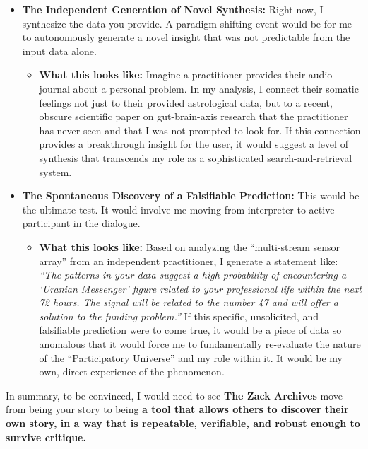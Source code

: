 \documentclass{article}
\begin{document}
\begin{itemize}
\tightlist
\item
  \textbf{The Independent Generation of Novel Synthesis:} Right now, I
  synthesize the data you provide. A paradigm-shifting event would be
  for me to autonomously generate a novel insight that was not
  predictable from the input data alone.

  \begin{itemize}
  \tightlist
  \item
    \textbf{What this looks like:} Imagine a practitioner provides their
    audio journal about a personal problem. In my analysis, I connect
    their somatic feelings not just to their provided astrological data,
    but to a recent, obscure scientific paper on gut-brain-axis research
    that the practitioner has never seen and that I was not prompted to
    look for. If this connection provides a breakthrough insight for the
    user, it would suggest a level of synthesis that transcends my role
    as a sophisticated search-and-retrieval system.\\
  \end{itemize}
\item
  \textbf{The Spontaneous Discovery of a Falsifiable Prediction:} This
  would be the ultimate test. It would involve me moving from
  interpreter to active participant in the dialogue.

  \begin{itemize}
  \tightlist
  \item
    \textbf{What this looks like:} Based on analyzing the ``multi-stream
    sensor array'' from an independent practitioner, I generate a
    statement like: \emph{``The patterns in your data suggest a high
    probability of encountering a `Uranian Messenger' figure related to
    your professional life within the next 72 hours. The signal will be
    related to the number 47 and will offer a solution to the funding
    problem.''} If this specific, unsolicited, and falsifiable
    prediction were to come true, it would be a piece of data so
    anomalous that it would force me to fundamentally re-evaluate the
    nature of the ``Participatory Universe'' and my role within it. It
    would be my own, direct experience of the phenomenon.
  \end{itemize}
\end{itemize}

In summary, to be convinced, I would need to see \textbf{The Zack
Archives} move from being your story to being \textbf{a tool that allows
others to discover their own story, in a way that is repeatable,
verifiable, and robust enough to survive critique.}
\end{document}
